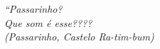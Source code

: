 \documentclass[
	oldfontcommands,
	sumario=tradicional,
	12pt,      %
	openright, %
	oneside,   %
	a4paper,   %
	english, %
	brazil   %
	]{00-configs/imecc-unicamp}
\begin{document}
			\begin{epigrafe}
				\vspace*{\fill}
				\begin{flushright}
				\textit{``Passarinho? \\
					Que som é esse???? \\
					(Passarinho, Castelo Ra-tim-bum)
				}
				\end{flushright}
			\end{epigrafe}
		
			
		
		
		
		
			
			
			
			\tableofcontents*
			\cleardoublepage
		
		\textual
		
		
\end{document}
